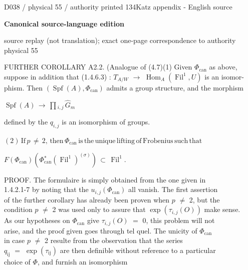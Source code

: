\documentclass[9pt]{article}
\newcommand{\CanonText}[1]{\par{\fontsize{8.0}{9.35}\selectfont\RaggedRight #1\par}\vspace{2.2pt}}
\newcommand{\CanonDisplay}[1]{\par\vspace{1.2pt}\begin{center}{\fontsize{7.2}{8.4}\selectfont\(\displaystyle #1\)}\end{center}\vspace{1.2pt}}
\newcommand{\LayerTitle}{Canonical source-language edition}
\begin{document}
\noindent\begin{minipage}[t][\dimexpr\textheight-5pt\relax][t]{\textwidth}
{\sffamily\fontsize{7.3}{8.2}\selectfont\color{Quiet} D038 / physical 55 / authority printed 134\hfill Katz appendix - English source}
\par{}\vspace{4.5pt}
{\sffamily\fontsize{10.4}{11.6}\selectfont\bfseries\color{Accent} \LayerTitle}
\par{\sffamily\fontsize{6.7}{7.7}\selectfont\color{Quiet} source replay (not translation); exact one-page correspondence to authority physical 55}
\vspace{5pt}
\CanonText{FURTHER COROLLARY A2.2. (Analogue of (4.7)(1) Given \(\Phi{}_{\mathrm{can}}\) as above,\\suppose in addition that (1.4.6.3) : \(T_{A/W}\) \(\to{}\) \(\operatorname{Hom}_{A}(\operatorname{Fil}^{1},U)\) is an isomor-\\phism. Then \((\operatorname{Spf}(A),\Phi{}_{\mathrm{can}})\) admits a group structure, and the morphism}
\CanonDisplay{\operatorname{Spf}(A)\,\to{}\,\prod{}_{i,j}\,\widehat{G}_{m}}
\CanonText{defined by the \(q_{i,j}\) is an isomorphism of groups.}
\CanonDisplay{(2)\,\text{If}\,p\,\neq{}\,2,\,\text{then}\,\Phi{}_{\mathrm{can}}\,\text{is}\,\text{the}\,\text{unique}\,\text{lifting}\,\text{of}\,\text{Frobenius}\,\text{such}\,\text{that}}
\CanonDisplay{F(\Phi{}_{\mathrm{can}})(\Phi{}_{\mathrm{can}}^{*}(\operatorname{Fil}^{1})^{(\sigma{})})\,\subset{}\,\operatorname{Fil}^{1}.}
\CanonText{PROOF. The formulaire is simply obtained from the one given in\\1.4.2.1-7 by noting that the \(u_{i,j}(\Phi{}_{\mathrm{can}})\) all vanish. The first assertion\\of the further corollary has already been proven when \(p\) \(\neq{}\) 2, but the\\condition \(p\) \(\neq{}\) 2 was used only to assure that \(\operatorname{exp}(\tau{}_{i,j}(O))\) make sense.\\As our hypotheses on \(\Phi{}_{\mathrm{can}}\) give \(\tau{}_{i,j}(O)\) \(=\) 0, this problem will not\\arise, and the proof given goes through tel quel. The unicity of \(\Phi{}_{\mathrm{can}}\)\\in case \(p\) \(\neq{}\) 2 resulte from the observation that the series\\\(q_{\mathrm{ij}}\) \(=\) \(\operatorname{exp}(\tau{}_{\mathrm{ij}})\) are then definible without reference to a particular\\choice of \(\Phi{}\), and furnish an isomorphism}

\end{minipage}
\end{document}
